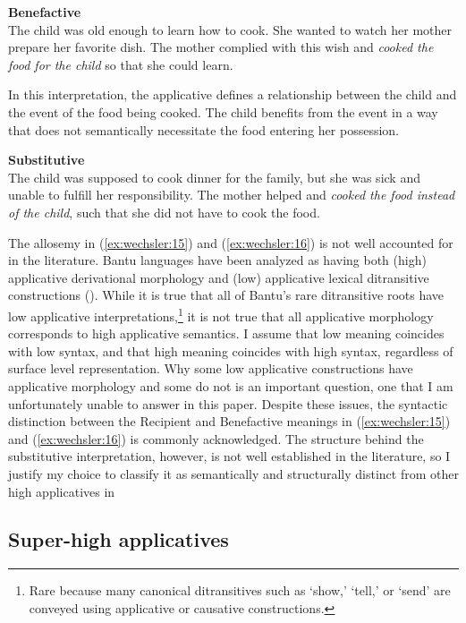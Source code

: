 \documentclass[output=paper,modfonts,nonflat,colorlinks,citecolor=brown]{langsci/langscibook}
\begin{document}
\ea\label{ex:wechsler:16}
\textbf{Benefactive}\\
The child was old enough to learn how to cook. She wanted to watch her mother prepare her favorite dish. The mother complied with this wish and \textit{cooked the food for the child} so that she could learn.\z

In this interpretation, the applicative defines a relationship between the child and the event of the food being cooked. The child benefits from the event in a way that does not semantically necessitate the food entering her possession.


\ea\label{ex:wechsler:17}
\textbf{Substitutive}\\
The child was supposed to cook dinner for the family, but she was sick and unable to fulfill her responsibility. The mother helped and \textit{cooked the food instead of the child}, such that she did not have to cook the food.\\
\z

The allosemy in (\ref{ex:wechsler:15}) and (\ref{ex:wechsler:16}) is not well accounted for in the literature. Bantu languages have been analyzed as having both (high) applicative derivational morphology and (low) applicative lexical ditransitive constructions (\citealt{vanderWal2017}). While it is true that all of Bantu’s rare ditransitive roots have low applicative interpretations,\footnote{Rare because many canonical ditransitives such as ‘show,’ ‘tell,’ or ‘send’ are conveyed using applicative or causative constructions.}  it is not true that all applicative morphology corresponds to high applicative semantics. I assume that low meaning coincides with low syntax, and that high meaning coincides with high syntax, regardless of surface level representation. Why some low applicative constructions have applicative morphology and some do not is an important question, one that I am unfortunately unable to answer in this paper. Despite these issues, the syntactic distinction between the Recipient and Benefactive meanings in (\ref{ex:wechsler:15}) and (\ref{ex:wechsler:16}) is commonly acknowledged. The structure behind the substitutive interpretation, however, is not well established in the literature, so I justify my choice to classify it as semantically and structurally distinct from other high applicatives in 

\subsection{Super-high applicatives}\label{sec:wechsler:3.3}
\end{document}
